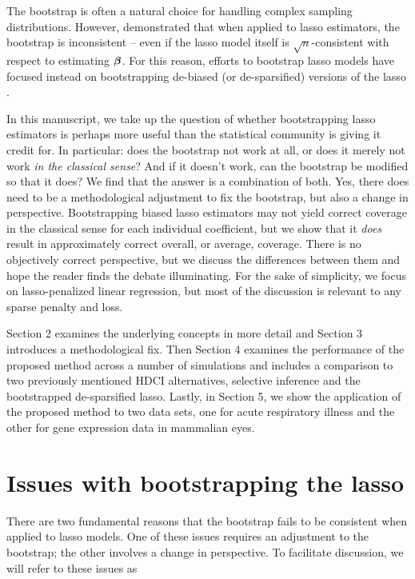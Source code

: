 The bootstrap is often a natural choice for handling complex sampling distributions. However, \cite{Chatterjee2010} demonstrated that when applied to lasso estimators, the bootstrap is inconsistent -- even if the lasso model itself is $\sqrt{n}$-consistent with respect to estimating $\boldsymbol{\beta}$. For this reason, efforts to bootstrap lasso models have focused instead on bootstrapping de-biased (or de-sparsified) versions of the lasso \citep{Dezeure2017}.

In this manuscript, we take up the question of whether bootstrapping lasso estimators is perhaps more useful than the statistical community is giving it credit for. In particular: does the bootstrap not work at all, or does it merely not work \emph{in the classical sense}? And if it doesn't work, can the bootstrap be modified so that it does? We find that the answer is a combination of both. Yes, there does need to be a methodological adjustment to fix the bootstrap, but also a change in perspective. Bootstrapping biased lasso estimators may not yield correct coverage in the classical sense for each individual coefficient, but we show that it \emph{does} result in approximately correct overall, or average, coverage. There is no objectively correct perspective, but we discuss the differences between them and hope the reader finds the debate illuminating. For the sake of simplicity, we focus on lasso-penalized linear regression, but most of the discussion is relevant to any sparse penalty and loss.

Section 2 examines the underlying concepts in more detail and Section 3 introduces a methodological fix. Then Section 4 examines the performance of the proposed method across a number of simulations and includes a comparison to two previously mentioned HDCI alternatives, selective inference and the bootstrapped de-sparsified lasso. Lastly, in Section 5, we show the application of the proposed method to two data sets, one for acute respiratory illness and the other for gene expression data in mammalian eyes.

\section{Issues with bootstrapping the lasso}
\label{Sec:Difficulties}

There are two fundamental reasons that the bootstrap fails to be consistent when applied to lasso models. One of these issues requires an adjustment to the bootstrap; the other involves a change in perspective. To facilitate discussion, we will refer to these issues as

